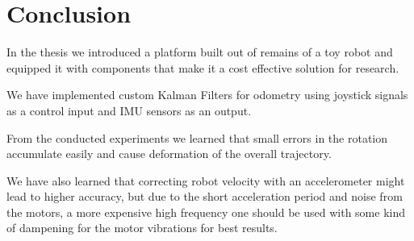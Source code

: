 \documentclass[class=report, crop=false]{standalone}
\begin{document}
\chapter{Conclusion}\label{cha:conclusion}

In the thesis we introduced a platform built out of remains of a toy robot and equipped it with components that make it a cost effective solution for research.

We have implemented custom Kalman Filters for odometry using joystick signals as a control input and IMU sensors as an output.

From the conducted experiments we learned that small errors in the rotation accumulate easily and cause deformation of the overall trajectory.

We have also learned that correcting robot velocity with an accelerometer might lead to higher accuracy, but due to the short acceleration period and noise from the motors, a more expensive high frequency one should be used with some kind of dampening for the motor vibrations for best results.
\end{document}
